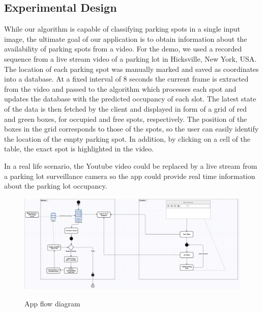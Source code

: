 \documentclass[12pt]{article}
\begin{document}
\subsection{Experimental Design}
While our algorithm is capable of classifying parking spots in a single input image, the ultimate goal of our application is to obtain information about the availability of parking spots from a video. 
For the demo, we used a recorded sequence from a live stream video of a parking lot in Hicksville, New York, USA. The location of each parking spot was manually marked and saved as coordinates into a database. 
At a fixed interval of 8 seconds the current frame is extracted from the video and passed to the algorithm which processes each spot and updates the database with the predicted occupancy of each slot.
The latest state of the data is then fetched by the client and displayed in form of a grid of red and green boxes, for occupied and free spots, respectively. 
The position of the boxes in the grid corresponds to those of the spots, so the user can easily identify the location of the empty parking spot. In addition, by clicking on a cell of the table, the exact spot is highlighted in the video.

In a real life scenario, the Youtube video could be replaced by a live stream from a parking lot surveillance camera so the app could provide real time information about the parking lot occupancy.

\clearpage

\begin{figure}
  \caption{App flow diagram}
  \includegraphics[width=1.0\textwidth]{flow}
  \label{fig:flowimg}
\end{figure}
\end{document}
